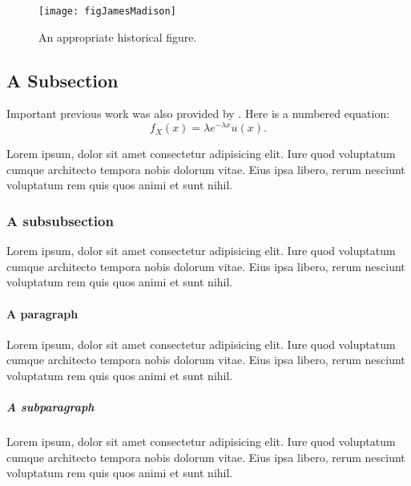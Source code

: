 \begin{figure}
  \centering
  \texttt{[image: figJamesMadison]}
  \caption[An appropriate historical figure]{An appropriate historical figure.}

  \figSpace
\end{figure}

\newpage

\subsection{A Subsection}

Important previous work was also provided by \cite{Shannon49}.  Here is a numbered equation:
\begin{equation}
    f_X(x) = \lambda e^{-\lambda x} u(x).
\end{equation}

Lorem ipsum, dolor sit amet consectetur adipisicing elit. Iure quod voluptatum cumque architecto tempora nobis dolorum vitae. Eius ipsa libero, rerum nesciunt voluptatum rem quis quos animi et sunt nihil.

\subsubsection{A subsubsection}

Lorem ipsum, dolor sit amet consectetur adipisicing elit. Iure quod voluptatum cumque architecto tempora nobis dolorum vitae. Eius ipsa libero, rerum nesciunt voluptatum rem quis quos animi et sunt nihil.

\paragraph{A paragraph}

Lorem ipsum, dolor sit amet consectetur adipisicing elit. Iure quod voluptatum cumque architecto tempora nobis dolorum vitae. Eius ipsa libero, rerum nesciunt voluptatum rem quis quos animi et sunt nihil.

\subparagraph{A subparagraph}

Lorem ipsum, dolor sit amet consectetur adipisicing elit. Iure quod voluptatum cumque architecto tempora nobis dolorum vitae. Eius ipsa libero, rerum nesciunt voluptatum rem quis quos animi et sunt nihil.



